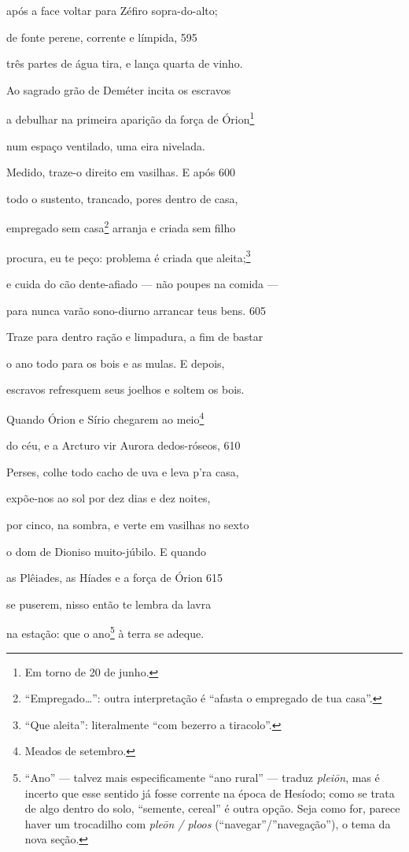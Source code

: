 após a face voltar para Zéfiro sopra-do-alto;

de fonte perene, corrente e límpida, \num{595}

três partes de água tira, e lança quarta de vinho.

Ao sagrado grão de Deméter incita os escravos

a debulhar na primeira aparição da força de Órion\footnote{Em torno de 20 de junho.}

num espaço ventilado, uma eira nivelada.

Medido, traze-o direito em vasilhas. E após \num{600}

todo o sustento, trancado, pores dentro de casa,

empregado sem casa\footnote{``Empregado\ldots{}'': outra interpretação é ``afasta o empregado de tua casa''.} arranja e criada sem filho

procura, eu te peço: problema é criada que aleita;\footnote{``Que aleita'': literalmente ``com bezerro a tiracolo''.}

e cuida do cão dente-afiado --- não poupes na comida ---

para nunca varão sono-diurno arrancar teus bens. \num{605}

Traze para dentro ração e limpadura, a fim de bastar

o ano todo para os bois e as mulas. E depois,

escravos refresquem seus joelhos e soltem os bois.

Quando Órion e Sírio chegarem ao meio\footnote{Meados de setembro.}

do céu, e a Arcturo vir Aurora dedos-róseos, \num{610}

Perses, colhe todo cacho de uva e leva p'ra casa,

expõe-nos ao sol por dez dias e dez noites,

por cinco, na sombra, e verte em vasilhas no sexto

o dom de Dioniso muito-júbilo. E quando

as Plêiades, as Híades e a força de Órion \num{615}

se puserem, nisso então te lembra da lavra

na estação: que o ano\footnote{``Ano'' --- talvez mais especificamente ``ano rural'' --- traduz
\emph{pleiōn}, mas é incerto que esse sentido já fosse corrente na época
de Hesíodo; como se trata de algo dentro do solo, ``semente, cereal'' é
outra opção. Seja como for, parece haver um trocadilho com \emph{pleōn /
ploos} (``navegar''/''navegação''), o tema da nova seção.} à terra se adeque.

